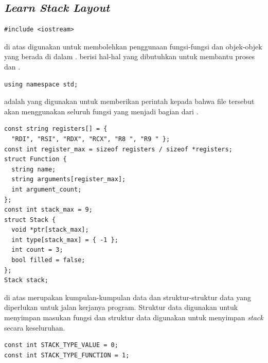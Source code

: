 \documentclass[../main.tex]{subfiles}
\begin{document}
\subsection{\textit{Learn Stack Layout}}

\begin{code}
\begin{verbatim}
#include <iostream>
\end{verbatim}
\end{code}

{\Script} di atas digunakan untuk membolehkan penggunaan fungsi-fungsi dan objek-objek yang berada di dalam {\header} {\file} . {\Header} {\file}  berisi hal-hal yang dibutuhkan untuk membantu proses {\ioi} dan {\ioo}.

\begin{code}
\begin{verbatim}
using namespace std;
\end{verbatim}
\end{code}

{\Script}  adalah {\statement} yang digunakan untuk memberikan perintah kepada {\compiler} bahwa file tersebut akan menggunakan seluruh fungsi yang menjadi bagian dari .

\begin{code}
\begin{verbatim}
const string registers[] = {
  "RDI", "RSI", "RDX", "RCX", "R8 ", "R9 " };
const int register_max = sizeof registers / sizeof *registers;
struct Function {
  string name;
  string arguments[register_max];
  int argument_count;
};
const int stack_max = 9;
struct Stack {
  void *ptr[stack_max];
  int type[stack_max] = { -1 };
  int count = 3;
  bool filled = false;
};
Stack stack;
\end{verbatim}
\end{code}

{\Script} di atas merupakan kumpulan-kumpulan data dan struktur-struktur data yang diperlukan untuk jalan kerjanya program. Struktur data  digunakan untuk menyimpan masukan fungsi dan struktur data  digunakan untuk menyimpan \textit{stack} secara keseluruhan.

\begin{code}
\begin{verbatim}
const int STACK_TYPE_VALUE = 0;
const int STACK_TYPE_FUNCTION = 1;
\end{verbatim}
\end{code}
\end{document}
